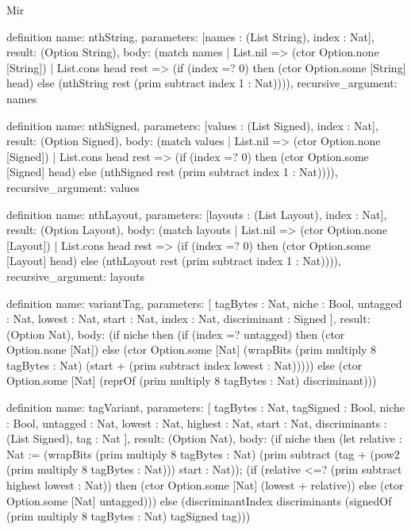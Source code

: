 \begin{lexlean}{Mir}
\begin{semanticmodule}
definition{
  name: nthString,
  parameters: [names : (List String), index : Nat],
  result: (Option String),
  body: (match names
    | List.nil => (ctor Option.none [String])
    | List.cons head rest => (if (index =? 0) then (ctor Option.some [String] head) else (nthString rest (prim subtract index 1 : Nat)))),
  recursive_argument: names
}

definition{
  name: nthSigned,
  parameters: [values : (List Signed), index : Nat],
  result: (Option Signed),
  body: (match values
    | List.nil => (ctor Option.none [Signed])
    | List.cons head rest => (if (index =? 0) then (ctor Option.some [Signed] head) else (nthSigned rest (prim subtract index 1 : Nat)))),
  recursive_argument: values
}

definition{
  name: nthLayout,
  parameters: [layouts : (List Layout), index : Nat],
  result: (Option Layout),
  body: (match layouts
    | List.nil => (ctor Option.none [Layout])
    | List.cons head rest => (if (index =? 0) then (ctor Option.some [Layout] head) else (nthLayout rest (prim subtract index 1 : Nat)))),
  recursive_argument: layouts
}

definition{
  name: variantTag,
  parameters: [
    tagBytes : Nat,
    niche : Bool,
    untagged : Nat,
    lowest : Nat,
    start : Nat,
    index : Nat,
    discriminant : Signed
  ],
  result: (Option Nat),
  body: (if niche then (if (index =? untagged) then (ctor Option.none [Nat]) else (ctor Option.some [Nat] (wrapBits (prim multiply 8 tagBytes : Nat) (start + (prim subtract index lowest : Nat))))) else (ctor Option.some [Nat] (reprOf (prim multiply 8 tagBytes : Nat) discriminant)))
}

definition{
  name: tagVariant,
  parameters: [
    tagBytes : Nat,
    tagSigned : Bool,
    niche : Bool,
    untagged : Nat,
    lowest : Nat,
    highest : Nat,
    start : Nat,
    discriminants : (List Signed),
    tag : Nat
  ],
  result: (Option Nat),
  body: (if niche then (let relative : Nat := (wrapBits (prim multiply 8 tagBytes : Nat) (prim subtract (tag + (pow2 (prim multiply 8 tagBytes : Nat))) start : Nat)); (if (relative <=? (prim subtract highest lowest : Nat)) then (ctor Option.some [Nat] (lowest + relative)) else (ctor Option.some [Nat] untagged))) else (discriminantIndex discriminants (signedOf (prim multiply 8 tagBytes : Nat) tagSigned tag)))
}


\end{semanticmodule}
\end{lexlean}
